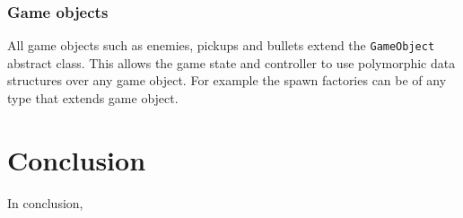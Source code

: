 \documentclass{article}
\begin{document}
\subsubsection{Game objects}
All game objects such as enemies, pickups and bullets extend the \texttt{GameObject} abstract class. This allows the game state and controller to use polymorphic data structures over any game object. For example the spawn factories can be of any type that extends game object. 

\section{Conclusion}
In conclusion, 

\printbibliography
\end{document}
